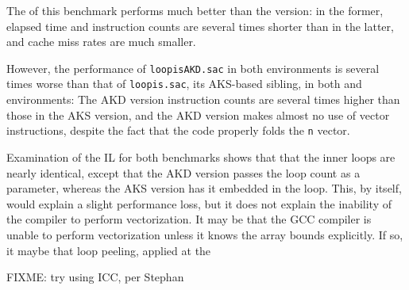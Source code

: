 The \awlf of this benchmark performs much better than the \wlf
version: in the former, elapsed time and instruction counts are
several times shorter than in the latter, and cache miss
rates are much smaller. 

However, the performance of {\tt loopisAKD.sac} 
in both environments is several times worse than that of 
{\tt loopis.sac}, its AKS-based sibling,
in both \wlf and \awlf environments: The AKD version
instruction counts are several times higher than those in
the AKS version, and the AKD version makes almost 
no use of vector instructions, despite the fact that
the \awlf code properly folds the {\tt \qiota\0n}
vector.

Examination of the IL for both benchmarks shows that
that the \awlf inner loops are nearly identical, except that the
AKD version passes the loop count as a parameter, whereas
the AKS version has it embedded in the loop. This, by
itself, would explain a slight performance loss, but it does
not explain the inability of the compiler to perform 
vectorization. It may be that the GCC compiler is unable
to perform vectorization unless it knows the array
bounds explicitly. If so, it maybe that loop peeling,
applied at the 
 
FIXME: try using ICC, per Stephan




